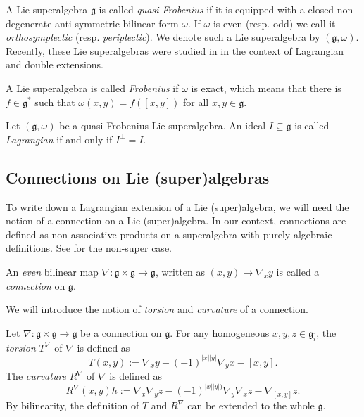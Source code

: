 \documentclass[12pt]{amsart}
\newtheorem{lemma}[Theorem]{Lemma}
\newcommand{\fg}{\mathfrak{g}}
\begin{document}
A Lie superalgebra $\fg$ is called \textit{quasi-Frobenius} if it is equipped with a closed non-degenerate anti-symmetric bilinear form $\omega$. If $\omega$ is even (resp. odd) we call it {\it orthosymplectic} (resp. {\it periplectic}). We denote such a Lie superalgebra by $(\fg, \omega)$. Recently, these Lie superalgebras were studied in \cite{BBE, BE, BEM, BM} in the context of Lagrangian and double extensions.  

A Lie superalgebra  is called \textit{Frobenius} if $\omega$ is exact, which means that there is $f\in \mathfrak{g}^*$ such that $\omega(x,y)=f([x,y])$ for all $x,y \in \mathfrak{g}.$

Let $(\fg,\omega)$ be a quasi-Frobenius Lie superalgebra. An ideal $I\subseteq \fg$ is called {\it Lagrangian} if and only if $I^\perp=I$. 

\subsection{Connections on Lie (super)algebras}
To write down a Lagrangian extension of a Lie (super)algebra, we will need the notion of a connection on a Lie (super)algebra. In our context, connections are defined as non-associative products on a superalgebra with purely algebraic definitions. See \cite{BM,MKSV} for the non-super case. 

An \emph{even} bilinear map $\nabla: \mathfrak{g} \times \mathfrak{g} \rightarrow \mathfrak{g}$, written as $(x,y) \rightarrow \nabla_x y $ is called a \emph{connection} on $ \mathfrak{g}.$

We will introduce the notion of  \emph{torsion} and \emph{curvature} of a connection. 

Let $\nabla : \mathfrak{g} \times \mathfrak{g} \rightarrow \mathfrak{g}$ be a connection on $\mathfrak g$. For any homogeneous  $x,y,z \in \mathfrak{g}_{\bar i}$, the  \textit{torsion} $T^{\nabla}$ of $\nabla$ is defined as 
\begin{equation}\label{TorCur} 
T(x,y) := \nabla_xy -(-1)^{|x||y|}\nabla_y x - [x,y].
\end{equation}
The \textit{curvature} $R^{\nabla}$ of $\nabla$ is defined as 
\begin{equation}\label{Cur} 
R^\nabla(x,y)h := \nabla _x \nabla_y z-(-1)^{|x||y|)}\nabla_y \nabla_x z - \nabla_{[x,y]}z.
\end{equation}
By bilinearity, the definition of  $T$ and $R^\nabla$ can be extended to the whole $\mathfrak g$. 
\end{document}
